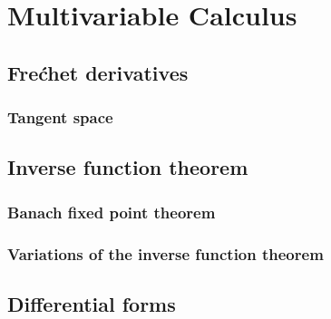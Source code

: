 \documentclass{../note}
\begin{document}
\chapter{}





\part{Multivariable Calculus}
\chapter{Fre\'chet derivatives}
\section{Tangent space}



\chapter{Inverse function theorem}
\section{Banach fixed point theorem}
\section{Variations of the inverse function theorem}





\chapter{Differential forms}
\end{document}
